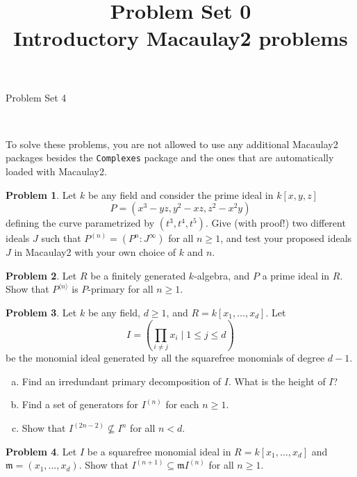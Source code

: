 \documentclass[11pt]{article}
\title{}
\date{\vspace{-0.5in}}
\title{Problem Set 0 \\ Introductory Macaulay2 problems}
\newcommand{\m}{\mathfrak{m}}
\theoremstyle{definition}
\newtheorem{problem}{Problem}
\begin{document}
\thispagestyle{fancy}
\pagestyle{fancy}


\begin{center}
	{\LARGE Problem Set 4\\
	
	
}
\end{center}

\

To solve these problems, you are not allowed to use any additional Macaulay2 packages besides the \texttt{Complexes} package and the ones that are automatically loaded with Macaulay2.


\begin{problem}
	Let $k$ be any field and consider the prime ideal in $k[x,y,z]$
	$$P = (x^3-yz,y^2-xz,z^2-x^2y)$$
	defining the curve parametrized by $(t^3, t^4, t^5)$. Give (with proof!) two different ideals $J$ such that $P^{(n)} = (P^n : J^\infty)$ for all $n \geqslant 1$, and test your proposed ideals $J$ in Macaulay2 with your own choice of $k$ and $n$.
\end{problem}


\begin{problem}
	Let $R$ be a finitely generated $k$-algebra, and $P$ a prime ideal in $R$. Show that $P^{\langle n\rangle}$ is $P$-primary for all $n \geqslant 1$.
\end{problem}



\begin{problem}
	Let $k$ be any field, $d \geqslant 1$, and $R = k[x_1, \ldots, x_d]$. Let
	$$I = \left( \prod_{i \neq j} x_{i} \mid 1 \leqslant j \leqslant d \right)$$
	be the monomial ideal generated by all the squarefree monomials of degree $d-1$. 
	\begin{enumerate}[a)]
		\item Find an irredundant primary decomposition of $I$. What is the height of $I$?
		\item Find a set of generators for $I^{(n)}$ for each $n \geqslant 1$.
		\item Show that $I^{(2n-2)} \nsubseteq I^n$ for all $n < d$.
	\end{enumerate}
\end{problem}

\begin{problem}
	Let $I$ be a squarefree monomial ideal in $ R = k[x_1, \ldots, x_d]$ and $\m = (x_1, \ldots, x_d)$. Show that $I^{(n+1)} \subseteq \m I^{(n)}$ for all $n \geqslant 1$.
\end{problem}
\end{document}

